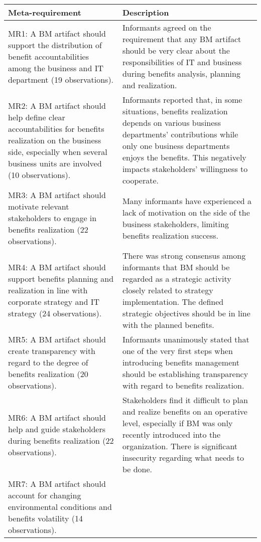 \begin{table}[H]
 \begin{tabular}{|p{6cm}|p{9cm}|}
  \hline
\textbf{Meta-requirement}		& \textbf{Description}\\
    \hline  
MR1: A BM artifact should support the distribution of benefit accountabilities
among the business and IT department (19 observations).
& 
Informants agreed on the requirement that any BM artifact should be very clear
about the responsibilities of IT and business during benefits analysis, planning
and realization.\\
\hline
MR2: A BM artifact should help define clear accountabilities for benefits realization on the business
side, especially when several business units are involved (10 observations).
&
Informants reported that, in some situations, benefits realization depends on
various business departments’ contributions while only one business
departments enjoys the benefits. This negatively impacts stakeholders’
willingness to cooperate.\\
\hline
MR3: A BM artifact should motivate relevant stakeholders to engage in benefits realization (22 observations).
&
Many informants have experienced a lack of motivation on the side of the business stakeholders, limiting benefits realization success.\\
\hline
MR4: A BM artifact should support benefits planning and realization in line with corporate strategy and IT strategy (24 observations).
&
There was strong consensus among informants that BM should be regarded as a strategic activity closely related to strategy implementation. The defined strategic objectives should be in line with the planned benefits.\\
\hline
MR5: A BM artifact should create transparency with regard to the degree of benefits realization (20
observations).
&
Informants unanimously stated that one of the very first steps when introducing benefits management should be establishing transparency with regard to benefits realization.\\
\hline
MR6: A BM artifact should help and guide stakeholders during benefits realization (22
observations).
&
Stakeholders find it difficult to plan and realize benefits on an operative level, especially if BM was only recently introduced into the organization. There is significant insecurity regarding what needs to be done.\\
\hline
MR7: A BM artifact should account for changing environmental conditions and benefits volatility (14
observations).

\end{tabular}
\end{table}
